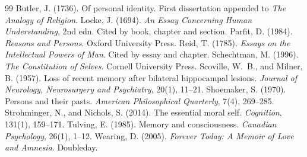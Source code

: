 \documentclass{situationist-preprint}
\begin{document}
\begin{thebibliography}{99}\small
{} Butler, J. (1736). Of personal identity. First dissertation appended to \emph{The Analogy of Religion}.
 Locke, J. (1694). \emph{An Essay Concerning Human Understanding}, 2nd edn. Cited by book, chapter and section.
 Parfit, D. (1984). \emph{Reasons and Persons}. Oxford University Press.
 Reid, T. (1785). \emph{Essays on the Intellectual Powers of Man}. Cited by essay and chapter.
 Schechtman, M. (1996). \emph{The Constitution of Selves}. Cornell University Press.
 Scoville, W.~B., and Milner, B. (1957). Loss of recent memory after bilateral hippocampal lesions. \emph{Journal of Neurology, Neurosurgery and Psychiatry}, 20(1), 11--21.
 Shoemaker, S. (1970). Persons and their pasts. \emph{American Philosophical Quarterly}, 7(4), 269--285.
 Strohminger, N., and Nichols, S. (2014). The essential moral self. \emph{Cognition}, 131(1), 159--171.
 Tulving, E. (1985). Memory and consciousness. \emph{Canadian Psychology}, 26(1), 1--12.
 Wearing, D. (2005). \emph{Forever Today: A Memoir of Love and Amnesia}. Doubleday.
\end{thebibliography}
\end{document}
